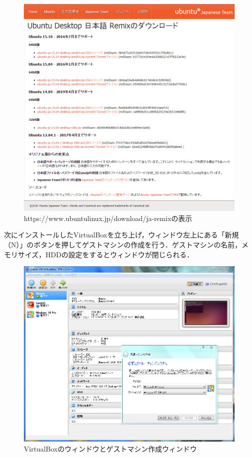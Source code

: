 \begin{figure}[H]
\centering
\includegraphics[width=13cm]{ubuntudownload.PNG}
\caption{https://www.ubuntulinux.jp/download/ja-remixの表示}\label{ubuntudownload}
\end{figure}

次にインストールしたVirtualBoxを立ち上げ，ウィンドウ左上にある「新規（N）」のボタンを押してゲストマシンの作成を行う．ゲストマシンの名前，メモリサイズ，HDDの設定をするとウィンドウが閉じられる．
	
\begin{figure}[H]
\centering
\includegraphics[width=13cm]{VBoxWindow.PNG}
\caption{VirtualBoxのウィンドウとゲストマシン作成ウィンドウ}\label{VBoxSetup}
\end{figure}

